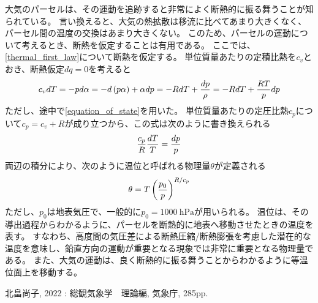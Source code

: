 \documentclass[a4paper,11pt,platex]{jsarticle}
\numberwithin{equation}{section}
\begin{document}
大気のパーセルは、その運動を追跡すると非常によく断熱的に振る舞うことが知られている。
言い換えると、大気の熱拡散は移流に比べてあまり大きくなく、パーセル間の温度の交換はあまり大きくない。
このため、パーセルの運動について考えるとき、断熱を仮定することは有用である。
ここでは、\autoref{thermal_first_law}について断熱を仮定する。
単位質量あたりの定積比熱を$c_v$とおき、断熱仮定$dq=0$を考えると
\begin{equation}
    c_v dT = -pd\alpha = -d\left(p\alpha\right) + \alpha dp = -RdT + {dp \over \rho} = -RdT + {RT \over p}dp
\end{equation}
ただし、途中で\autoref{equation_of_state}を用いた。
単位質量あたりの定圧比熱$c_p$について$c_p=c_v+R$が成り立つから、この式は次のように書き換えられる
\begin{equation}
    {c_p \over R} {dT \over T} = {dp \over p}
\end{equation}
両辺の積分により、次のように温位と呼ばれる物理量$\theta$が定義される
\begin{equation}
    \theta = T \left({p_0 \over p}\right)^{R/c_p}
\end{equation}
ただし、$p_0$は地表気圧で、一般的に$p_0=1000 \: \mathrm{hPa}$が用いられる。
温位は、その導出過程からわかるように、パーセルを断熱的に地表へ移動させたときの温度を表す。
すなわち、高度間の気圧差による断熱圧縮/断熱膨張を考慮した潜在的な温度を意味し、鉛直方向の運動が重要となる現象では非常に重要となる物理量である。
また、大気の運動は、良く断熱的に振る舞うことからわかるように等温位面上を移動する。






\clearpage

\begin{thebibliography}{100}
    \item 北畠尚子, 2022 : 総観気象学　理論編, 気象庁, 285pp.
\end{thebibliography}
\end{document}
